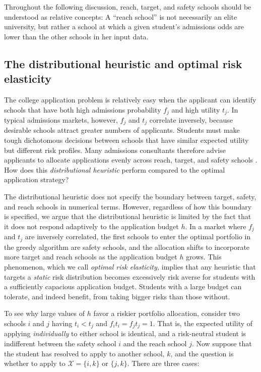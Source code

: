 Throughout the following discussion, reach, target, and safety schools should be understood as relative concepts: A ``reach school'' is not necessarily an elite university, but rather a school at which a given student's admissions odds are lower than the other schools in her input data. 


\subsection{The distributional heuristic and optimal risk elasticity}

The college application problem is relatively easy when the applicant can identify schools that have both high admissions probability $f_j$ and high utility $t_j$. In typical admissions markets, however, $f_j$ and $t_j$ correlate inversely, because desirable schools attract greater numbers of applicants. Students must make tough dichotomous decisions between schools that have similar expected utility but different risk profiles. Many admissions consultants therefore advise applicants to allocate applications evenly across reach, target, and safety schools \cite{jeon2015,peck2021}. How does this \emph{distributional heuristic} perform compared to the optimal application strategy?

The distributional heuristic does not specify the boundary between target, safety, and reach schools in numerical terms. However, regardless of how this boundary is specified, we argue that the distributional heuristic is limited by the fact that it does not respond adaptively to the application budget $h$. In a market where $f_j$ and $t_j$ are inversely correlated, the first schools to enter the optimal portfolio in the greedy algorithm are safety schools, and the allocation shifts to incorporate more target and reach schools as the application budget $h$ grows. This phenomenon, which we call \emph{optimal risk elasticity,} implies that any heuristic that targets a \emph{static} risk distribution becomes excessively risk averse for students with a sufficiently capacious application budget. Students with a large budget can tolerate, and indeed benefit, from taking bigger risks than those without.

To see why large values of $h$ favor a riskier portfolio allocation, consider two schools $i$ and $j$ having $t_i < t_j$ and $f_i t_i = f_j t_j = 1$. That is, the expected utility of applying \emph{individually} to either school is identical, and a risk-neutral student is indifferent between the safety school $i$ and the reach school $j$. Now suppose that the student has resolved to apply to another school, $k$, and the question is whether to apply to  $\mathcal{X} = \{i, k\}$ or $\{j, k\}$. There are three cases:

